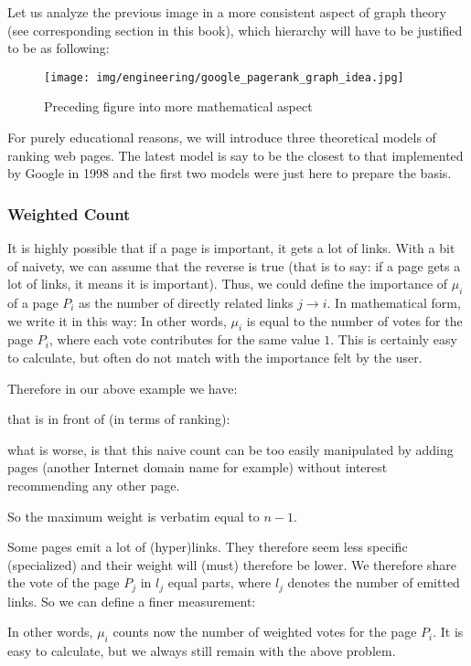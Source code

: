 	Let us analyze the previous image in a more consistent aspect of graph theory (see corresponding section in this book), which hierarchy will have to be justified to be as following:
	\begin{figure}[H]
		\centering
		\texttt{[image: img/engineering/google\_pagerank\_graph\_idea.jpg]}
		\caption[]{Preceding figure into more mathematical aspect}
	\end{figure}
	For purely educational reasons, we will introduce three theoretical models of ranking web pages. The latest model is say to be the closest to that implemented by Google in 1998 and the first two models were just here to prepare the basis.
	
	\subsubsection{Weighted Count}
	It is highly possible that if a page is important, it gets a lot of links. With a bit of naivety, we can assume that the reverse is true (that is to say: if a page gets a lot of links, it means it is important). Thus, we could define the importance of $\mu_i$ of a page $P_i$ as the number of directly related links $j\rightarrow i$. In mathematical form, we write it in this way:
	In other words, $\mu_i$ is equal to the number of votes for the page $P_i$, where each vote contributes for the same value $1$. This is certainly easy to calculate, but often do not match with the importance felt by the user.

	Therefore in our above example we have:
	
	that is in front of (in terms of ranking):
	
	what is worse, is that this naive count can be too easily manipulated by adding pages (another Internet domain name for example) without interest recommending any other page.
	\begin{tcolorbox}[title=Remark,colframe=black,arc=10pt]
	So the maximum weight is verbatim equal to $n-1$.
	\end{tcolorbox}
	Some pages emit a lot of (hyper)links. They therefore seem less specific (specialized) and their weight will (must) therefore be lower. We therefore share the vote of the page $P_j$ in $l_j$ equal parts, where $l_j$ denotes the number of emitted links. So we can define a finer measurement:
	
	In other words, $\mu_i$ counts now the number of weighted votes for the page $P_i$. It is easy to calculate, but we always still remain with the above problem.
	
